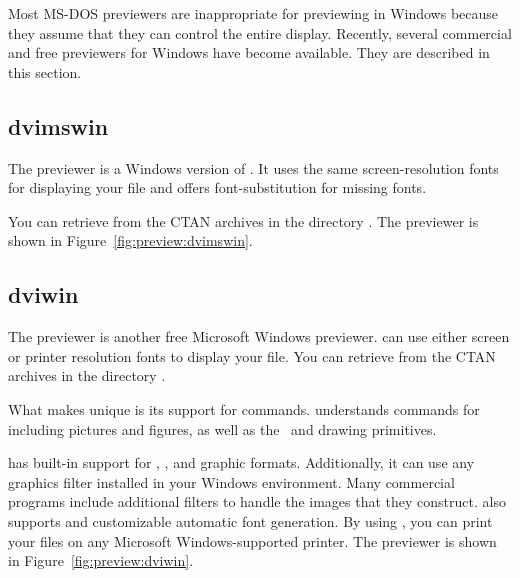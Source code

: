 Most MS-DOS previewers are inappropriate for previewing in 
Windows
because they assume that they can control the entire display. Recently,
several commercial and free previewers for Windows have become available.
They are described in this section.

\subsection{dvimswin}

The 
previewer is a Windows version of
.  It uses the same screen-resolution fonts for
displaying your  file and offers font-substitution for
missing fonts.

You can retrieve  from the CTAN archives in
the directory .
The  previewer is shown in
Figure~\ref{fig:preview:dvimswin}.


\newpage
\subsection{dviwin}

The 
previewer is another free Microsoft Windows
previewer.   can use either screen or printer resolution
fonts 
to display your  file.
You can retrieve  from the CTAN archives in
the directory .

What makes  unique is its support for  commands.
 understands  commands for including pictures
and figures, as well as the \emTeX\ and  drawing primitives.

 has built-in support for , , and
 graphic formats.  
Additionally, it can use any graphics filter
installed in your Windows environment.  Many commercial programs include
additional filters to handle the images that they construct.  
 also supports  and customizable
automatic font generation.  By using , you can print your
 files on any Microsoft Windows-supported printer.
The  previewer is shown in Figure~\ref{fig:preview:dviwin}.

